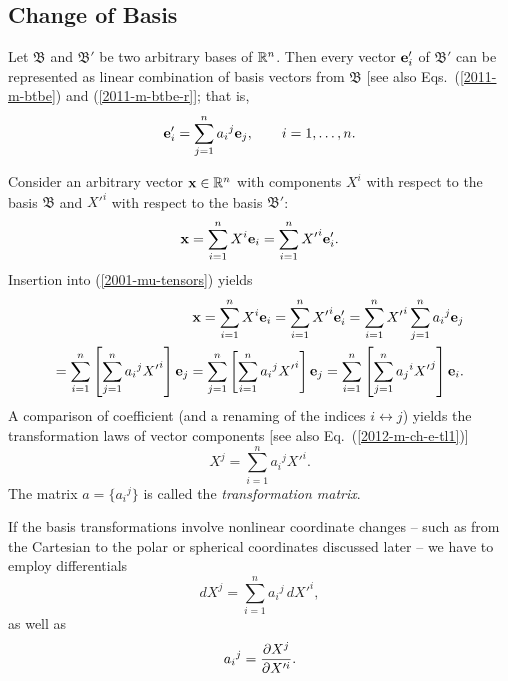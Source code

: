 \subsection{Change of Basis}
Let
${\mathfrak B}$
and
${\mathfrak B'}$
be two arbitrary bases of
${\Bbb R}^n$.
Then every vector ${\bf e}'_i$ of
${\mathfrak B'}$
can be represented as linear combination of basis vectors from
${\mathfrak B}$ [see also Eqs.~(\ref{2011-m-btbe}) and (\ref{2011-m-btbe-r}]; that is,
\begin{equation}
{\bf e}'_i=\sum_{j=1}^n {a_i}^j {\bf e}_j, \qquad i=1,\ldots , n  .
\label{2001-mu-tensors}
\end{equation}


Consider an arbitrary vector ${\bf x} \in {\Bbb R}^n$
with components $X^i$ with respect to the basis
${\mathfrak B}$
and   ${X'}^i$  with respect to the basis
${\mathfrak B'}$:
\begin{equation}
{\bf x}
=\sum_{i=1}^n X^i {\bf e}_i
=\sum_{i=1}^n {X'}^i {\bf e}'_i
.
\end{equation}
Insertion into (\ref{2001-mu-tensors}) yields
\begin{equation}
\begin{split}
{\bf x}
=\sum_{i=1}^n X^i {\bf e}_i
=\sum_{i=1}^n {X'}^i {\bf e}'_i
=\sum_{i=1}^n {X'}^i \sum_{j=1}^n {a_i}^j {\bf e}_j\\
=
\sum_{i=1}^n\left[\sum_{j=1}^n {a_i}^j{X'}^i \right] {\bf e}_j
=
\sum_{j=1}^n\left[ \sum_{i=1}^n {a_i}^j{X'}^i \right] {\bf e}_j
=
\sum_{i=1}^n\left[ \sum_{j=1}^n {a_j}^i{X'}^j \right] {\bf e}_i
.
\end{split}
\end{equation}
A comparison of coefficient
(and a renaming of the
indices $i \leftrightarrow j$)
yields the transformation laws of vector components
[see also Eq.~(\ref{2012-m-ch-e-tl1})]
\begin{equation}
X^j   = \sum_{i=1}^n {a_i}^j{X'}^i.
\label{2012-m-ch-di-choic}
\end{equation}
The matrix $a=\{{a_i}^j\}$ is called the {\em transformation matrix}.

If the basis transformations involve nonlinear coordinate changes -- such as from the
Cartesian to the polar or spherical coordinates discussed later -- we have to employ differentials
\begin{equation}
dX^j   = \sum_{i=1}^n {a_i}^j \,d{X'}^i  ,
\label{2012-m-ch-di-choic11}
\end{equation}
as well as
\begin{equation}
{a_i}^j ={\partial X^j \over \partial X'^i}   .
\label{2001-mu-tensor-tl11}
\end{equation}

